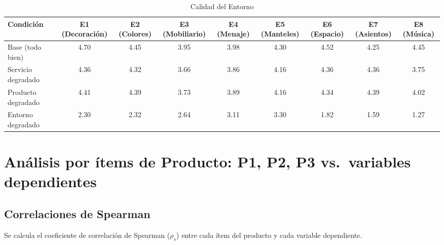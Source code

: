\documentclass[
  spanish,
]{article}
\begin{document}
\begingroup\fontsize{9}{11}\selectfont

\begin{longtable}[t]{lcccccccc}
\caption{\label{tab:tabla-calidad-entorno}Calidad del Entorno}\\
\toprule
Condición & E1 (Decoración) & E2 (Colores) & E3 (Mobiliario) & E4 (Menaje) & E5 (Manteles) & E6 (Espacio) & E7 (Asientos) & E8 (Música)\\
\midrule
Base (todo bien) & 4.70 & 4.45 & 3.95 & 3.98 & 4.30 & 4.52 & 4.25 & 4.45\\
Servicio degradado & 4.36 & 4.32 & 3.66 & 3.86 & 4.16 & 4.36 & 4.36 & 3.75\\
Producto degradado & 4.41 & 4.39 & 3.73 & 3.89 & 4.16 & 4.34 & 4.39 & 4.02\\
Entorno degradado & 2.30 & 2.32 & 2.64 & 3.11 & 3.30 & 1.82 & 1.59 & 1.27\\
\bottomrule
\end{longtable}
\endgroup{}

\newpage

\section{Análisis por ítems de Producto: P1, P2, P3 vs.~variables
dependientes}\label{anuxe1lisis-por-uxedtems-de-producto-p1-p2-p3-vs.-variables-dependientes}

\subsection{Correlaciones de Spearman}\label{correlaciones-de-spearman}

Se calcula el coeficiente de correlación de Spearman (\(\rho_s\)) entre
cada ítem del producto y cada variable dependiente.
\end{document}
